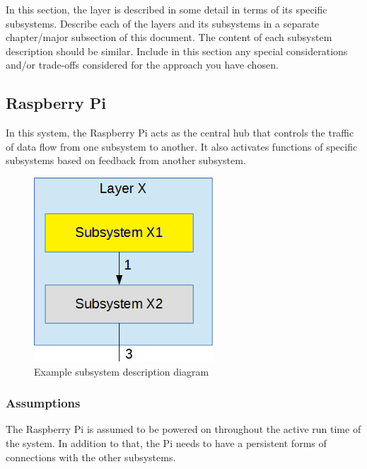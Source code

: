 In this section, the layer is described in some detail in terms of its specific subsystems. Describe each of the layers and its subsystems in a separate chapter/major subsection of this document. The content of each subsystem description should be similar. Include in this section any special considerations and/or trade-offs considered for the approach you have chosen.

\subsection{Raspberry Pi}
In this system, the Raspberry Pi acts as the central hub that controls the traffic of data flow from one subsystem to another. It also activates functions of specific subsystems based on feedback from another subsystem.

\begin{figure}[h!]
	\centering
 	\includegraphics[width=0.60\textwidth]{images/subsystem}
 \caption{Example subsystem description diagram}
\end{figure}

\subsubsection{Assumptions}
The Raspberry Pi is assumed to be powered on throughout the active run time of the system. In addition to that, the Pi needs to have a persistent forms of connections with the other subsystems.

